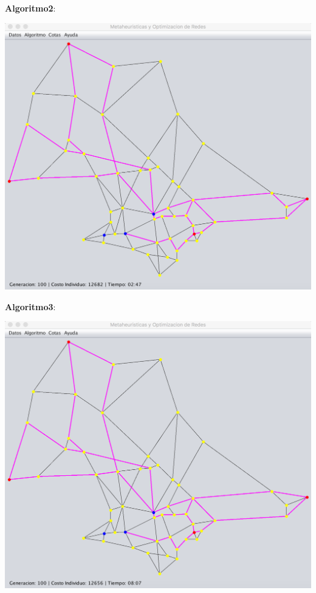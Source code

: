 \documentclass{extarticle}
\begin{document}
\textbf{Algoritmo2}:
\begin{center}
	\includegraphics[scale=0.4]{img/metaheuristica/i1_s2}
\end{center}

\textbf{Algoritmo3}:
\begin{center}
	\includegraphics[scale=0.4]{img/metaheuristica/i1_s3}
\end{center}
\end{document}
